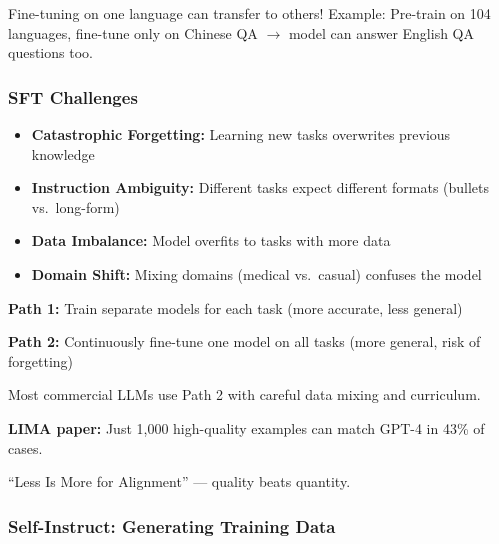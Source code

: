 \begin{tipbox}
Fine-tuning on one language can transfer to others! Example: Pre-train on 104 languages, fine-tune only on Chinese QA $\to$ model can answer English QA questions too.
\end{tipbox}

\bigseparator

\subsubsection{SFT Challenges}

\begin{defbox}
\begin{itemize}
  \item \textbf{Catastrophic Forgetting:} Learning new tasks overwrites previous knowledge
  \item \textbf{Instruction Ambiguity:} Different tasks expect different formats (bullets vs.\ long-form)
  \item \textbf{Data Imbalance:} Model overfits to tasks with more data
  \item \textbf{Domain Shift:} Mixing domains (medical vs.\ casual) confuses the model
\end{itemize}
\end{defbox}

\begin{tipbox}
\textbf{Path 1:} Train separate models for each task (more accurate, less general)

\textbf{Path 2:} Continuously fine-tune one model on all tasks (more general, risk of forgetting)

Most commercial LLMs use Path 2 with careful data mixing and curriculum.
\end{tipbox}

\begin{tipbox}
\textbf{LIMA paper:} Just 1,000 high-quality examples can match GPT-4 in 43\% of cases.

``Less Is More for Alignment'' --- quality beats quantity.
\end{tipbox}

\bigseparator

\subsubsection{Self-Instruct: Generating Training Data}

